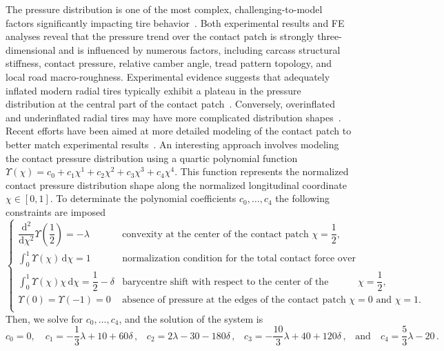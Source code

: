 The pressure distribution is one of the most complex, challenging-to-model factors significantly impacting tire behavior~\cite{savkoor1966some}. Both experimental results and \ac{FE} analyses reveal that the pressure trend over the contact patch is strongly three-dimensional and is influenced by numerous factors, including carcass structural stiffness, contact pressure, relative camber angle, tread pattern topology, and local road macro-roughness. Experimental evidence suggests that adequately inflated modern radial tires typically exhibit a plateau in the pressure distribution at the central part of the contact patch~\cite[Chapter~5]{nakajima2019advanced}. Conversely, overinflated and underinflated radial tires may have more complicated distribution shapes~\cite{nakajima2019advanced, sakai1995measurement}. Recent efforts have been aimed at more detailed modeling of the contact patch to better match experimental results~\cite{miyashita2010tire, fevrier2013method, xu2014analytical}. An interesting approach involves modeling the contact pressure distribution using a quartic polynomial function $\Upsilon(\chi) = c_0 + c_1\chi^1 + c_2\chi^2 + c_3\chi^3 + c_4\chi^4$. This function represents the normalized contact pressure distribution shape along the normalized longitudinal coordinate $\chi \in [0, 1]$. To determinate the polynomial coefficients $c_0, \dots, c_4$ the following constraints are imposed
%
\begin{equation}
  \begin{cases}
    \dfrac{\mathrm{d}^2}{\mathrm{d}\chi^2}\Upsilon\left(\dfrac{1}{2}\right) = -\lambda & \text{convexity at the center of the contact patch $\chi = \dfrac{1}{2}$,}
    \\[1.0em]
    \displaystyle\int_{0}^{1} \Upsilon(\chi)\,\mathrm{d}\chi = 1 & \text{normalization condition for the total contact force over the contact patch,}
    \\[1.0em]
    \displaystyle\int_{0}^{1} \Upsilon(\chi)\chi\,\mathrm{d}\chi = \dfrac{1}{2} - \delta & \text{barycentre shift with respect to the center of the contact patch $\chi = \dfrac{1}{2}$,}
    \\[1.5em]
    \Upsilon(0) = \Upsilon(-1) = 0 & \text{absence of pressure at the edges of the contact patch $\chi = 0$ and $\chi = 1$.}
    \\[0.5em]
  \end{cases}
  \label{app3:eq:upsilon}
\end{equation}
%
Then, we solve for $c_0, \dots, c_4$, and the solution of the system is
%
\begin{equation*}
  c_0 = 0, \quad
  c_1 = -\dfrac{1}{3}\lambda + 10 + 60\delta \, \text{,} \quad
  c_2 = 2\lambda - 30 - 180\delta \, \text{,} \quad
  c_3 = -\dfrac{10}{3}\lambda + 40 + 120\delta \, \text{,} \quad \text{and} \quad
  c_4 = \dfrac{5}{3}\lambda - 20 \, \text{.}
\end{equation*}
